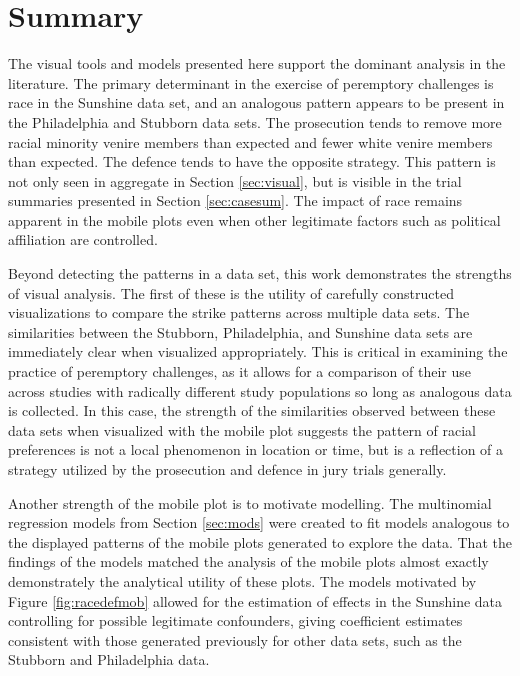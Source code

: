 \section{Summary}
\label{c:summary}

The visual tools and models presented here support the dominant analysis in the literature. The primary determinant in the
exercise of peremptory challenges is race in the Sunshine data set, and an analogous pattern appears to be present in the Philadelphia and Stubborn data sets. The prosecution tends to remove more racial minority venire members than expected and fewer white venire members than expected. The defence tends to have the opposite strategy. This pattern is not only seen in aggregate in Section \ref{sec:visual}, but is visible in the trial summaries
presented in Section \ref{sec:casesum}. The impact of race remains apparent in the mobile plots even when other legitimate factors
such as political affiliation are controlled.

Beyond detecting the patterns in a data set, this work demonstrates the strengths of visual
analysis. The first of these is the utility of carefully constructed visualizations to compare the strike patterns across multiple data sets. The
similarities between the Stubborn, Philadelphia, and Sunshine data sets are immediately clear when visualized appropriately. This
is critical in examining the practice of peremptory challenges, as it allows for a comparison of their use across studies with
radically different study populations so long as analogous data is collected. In this case, the strength of the similarities observed between these data sets when visualized with the mobile plot suggests the pattern of racial preferences is not a local phenomenon in location or time, but is a reflection of a strategy utilized by the prosecution and defence in jury trials generally.

Another strength of the mobile plot is to motivate modelling. The multinomial regression models from Section \ref{sec:mods}
were created to fit models analogous to the displayed patterns of the mobile plots generated to explore the data. That the findings of the
models matched the analysis of the mobile plots almost exactly demonstrately the analytical utility of these plots. The models motivated by Figure \ref{fig:racedefmob} allowed for the estimation of effects in the Sunshine data controlling for possible legitimate confounders, giving
coefficient estimates consistent with those generated previously for other data sets, such as the Stubborn and Philadelphia data.

